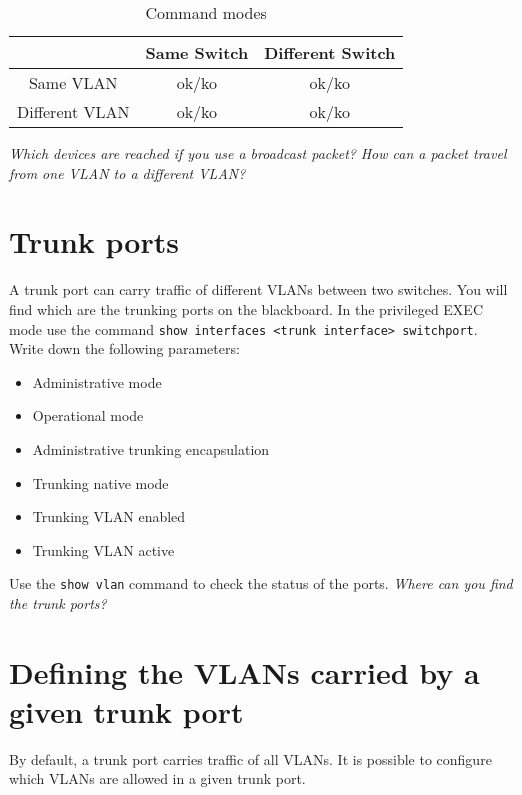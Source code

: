\begin{table}[!t]
\renewcommand{\arraystretch}{1.3}
\caption{Command modes}
\label{tab:connectivity}
\centering
\begin{tabular}{|c|c|c|}
\hline
& Same Switch & Different Switch\\
\hline
Same VLAN & ok/ko & ok/ko \\
\hline
Different VLAN & ok/ko & ok/ko \\
\hline
\end{tabular}
\end{table}

\emph{Which devices are reached if you use a broadcast packet?}
\emph{How can a packet travel from one VLAN to a different VLAN?}

\section{Trunk ports}

A trunk port can carry traffic of different VLANs between two switches.
You will find which are the trunking ports on the blackboard.
In the privileged EXEC mode use the command \texttt{show interfaces <trunk interface> switchport}.
Write down the following parameters:
\begin{itemize}
\item Administrative mode
\item Operational mode
\item Administrative trunking encapsulation
\item Trunking native mode
\item Trunking VLAN enabled
\item Trunking VLAN active
\end{itemize}

Use the \texttt{show vlan} command to check the status of the ports.
\emph{Where can you find the trunk ports?}

\section{Defining the VLANs carried by a given trunk port}

By default, a trunk port carries traffic of all VLANs.
It is possible to configure which VLANs are allowed in a given trunk port.

